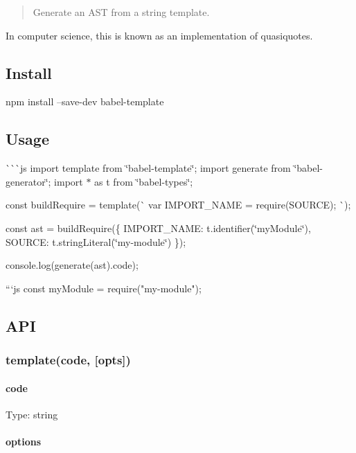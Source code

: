 \begin{quote}
Generate an A\+ST from a string template. \end{quote}


In computer science, this is known as an implementation of quasiquotes.

\subsection*{Install}


\begin{DoxyCode}
npm install --save-dev babel-template
\end{DoxyCode}


\subsection*{Usage}

\`{}\`{}\`{}js import template from \char`\"{}babel-\/template\char`\"{}; import generate from \char`\"{}babel-\/generator\char`\"{}; import $\ast$ as t from \char`\"{}babel-\/types\char`\"{};

const build\+Require = template(\`{} var I\+M\+P\+O\+R\+T\+\_\+\+N\+A\+ME = require(\+S\+O\+U\+R\+C\+E); \`{});

const ast = build\+Require(\{ I\+M\+P\+O\+R\+T\+\_\+\+N\+A\+ME\+: t.\+identifier(\char`\"{}my\+Module\char`\"{}), S\+O\+U\+R\+CE\+: t.\+string\+Literal(\char`\"{}my-\/module\char`\"{}) \});

console.\+log(generate(ast).code); 
\begin{DoxyCode}
```js
const myModule = require("my-module");
\end{DoxyCode}


\subsection*{A\+PI}

\subsubsection*{{\ttfamily template(code, \mbox{[}opts\mbox{]})}}

\paragraph*{code}

Type\+: {\ttfamily string}

\paragraph*{options}

